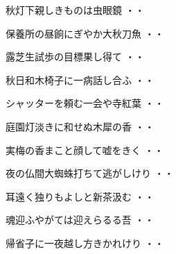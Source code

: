 \vspace{0.6cm}
\begin{shiika}秋灯下親しきものは虫眼鏡
\hfill{・・}\end{shiika}
\vspace{0.6cm}
\begin{shiika}保養所の昼餉にぎやか大秋刀魚
\hfill{・・}\end{shiika}
\vspace{0.6cm}
\begin{shiika}露芝生試歩の目標果し得て
\hfill{・・}\end{shiika}
\vspace{0.6cm}
\begin{shiika}秋日和木椅子に一病話し合ふ
\hfill{・・}\end{shiika}
\vspace{0.6cm}
\begin{shiika}シャッターを頼む一会や寺紅葉
\hfill{・・}\end{shiika}
\vspace{0.6cm}
\begin{shiika}庭園灯淡きに和せぬ木犀の香
\hfill{・・}\end{shiika}
\vspace{0.6cm}
\begin{shiika}実梅の香まこと顔して嘘をきく
\hfill{・・}\end{shiika}
\vspace{0.6cm}
\begin{shiika}夜の仏間大蜘蛛打ちて逃がしけり
\hfill{・・}\end{shiika}
\vspace{0.6cm}
\begin{shiika}耳遠く独りもよしと新茶汲む
\hfill{・・}\end{shiika}
\vspace{0.6cm}
\begin{shiika}魂迎ふやがては迎えらるる吾
\hfill{・・}\end{shiika}
\vspace{0.6cm}
\begin{shiika}帰省子に一夜越し方きかれけり
\hfill{・・}\end{shiika}
